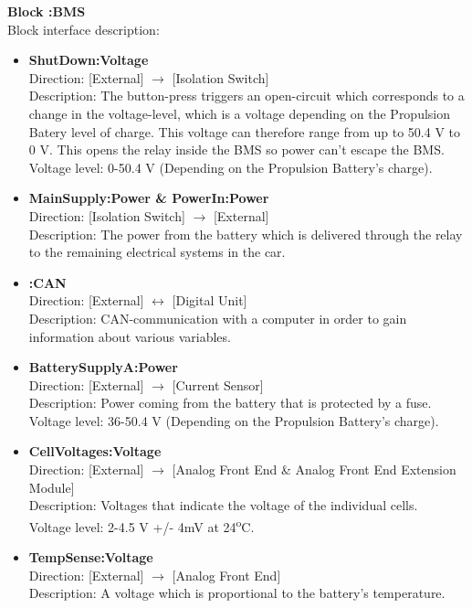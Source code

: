 \textbf{Block :BMS}\\
Block interface description:
\begin{itemize}
	\item \textbf{ShutDown:Voltage}\\
	Direction: [External] $\rightarrow$ [Isolation Switch]\\
	Description: The button-press triggers an open-circuit which corresponds to a change in the voltage-level, which is a voltage depending on the Propulsion Batery level of charge. This voltage can therefore range from up to 50.4 V to 0 V. This opens the relay inside the BMS so power can't escape the BMS.\\
	Voltage level: 0-50.4 V (Depending on the Propulsion Battery's charge).
	\item \textbf{MainSupply:Power \& PowerIn:Power}\\
	Direction: [Isolation Switch] $\rightarrow$ [External]\\
	Description: The power from the battery which is delivered through the relay to the remaining electrical systems in the car. 
	\item \textbf{:CAN}\\
	Direction: [External] $\leftrightarrow$ [Digital Unit]\\
	Description: CAN-communication with a computer in order to gain information about various variables.
	\item \textbf{BatterySupplyA:Power}\\
	Direction: [External] $\rightarrow$ [Current Sensor]\\
	Description: Power coming from the battery that is protected by a fuse.\\
	Voltage level: 36-50.4 V (Depending on the Propulsion Battery's charge).
	\item \textbf{CellVoltages:Voltage}\\
	Direction: [External] $\rightarrow$ [Analog Front End \& Analog Front End Extension Module]\\
	Description: Voltages that indicate the voltage of the individual cells.\\
	Voltage level: 2-4.5 V +/- 4mV at 24\textsuperscript{o}C\cite{BMSDocumentation}. 
	\item \textbf{TempSense:Voltage}\\
	Direction: [External] $\rightarrow$ [Analog Front End]\\
	Description: A voltage which is proportional to the battery's temperature.
\end{itemize}

